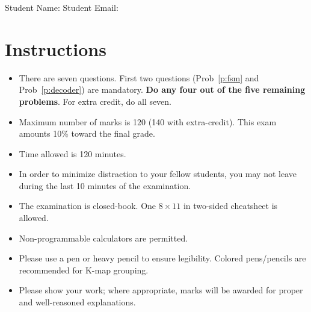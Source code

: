 \maketitle

Student Name: \hfill Student Email: \hspace{10em}
\section{Instructions}
\begin{itemize}
\item  There are seven questions. First two questions (Prob~\ref{p:fsm} and
  Prob~\ref{p:decoder}) are mandatory. \textbf{Do any four out of the 
    five remaining problems}. For extra credit, do all seven.
\item Maximum number of marks is 120 (140 with extra-credit). This exam
  amounts 10\% toward the final grade.
  \item Time allowed is 120 minutes.
  \item In order to minimize distraction to your fellow students, you may not leave
  during the last 10 minutes of the examination.
  \item The examination is closed-book. One $8\times11$ in two-sided cheatsheet is allowed.
  \item Non-programmable calculators are permitted.
  \item Please use a pen or heavy pencil to ensure legibility. Colored
    pens/pencils are recommended for K-map grouping.
  \item Please show your work; where appropriate, marks will be awarded for proper and well-reasoned explanations.
\end{itemize}
\newpage

